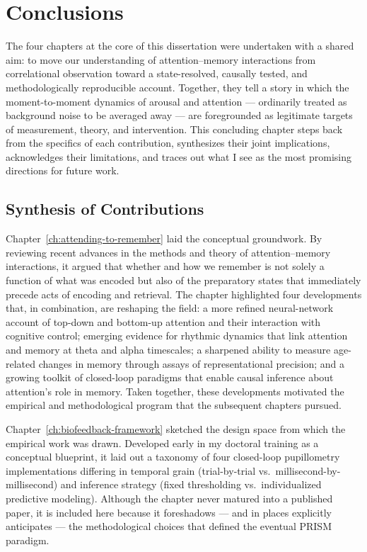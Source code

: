 \chapter{Conclusions}\label{ch:conclusions}

The four chapters at the core of this dissertation were undertaken with a shared aim: to move our understanding of attention--memory interactions from correlational observation toward a state-resolved, causally tested, and methodologically reproducible account. Together, they tell a story in which the moment-to-moment dynamics of arousal and attention --- ordinarily treated as background noise to be averaged away --- are foregrounded as legitimate targets of measurement, theory, and intervention. This concluding chapter steps back from the specifics of each contribution, synthesizes their joint implications, acknowledges their limitations, and traces out what I see as the most promising directions for future work.

\section{Synthesis of Contributions}

Chapter~\ref{ch:attending-to-remember} laid the conceptual groundwork. By reviewing recent advances in the methods and theory of attention--memory interactions, it argued that whether and how we remember is not solely a function of what was encoded but also of the preparatory states that immediately precede acts of encoding and retrieval. The chapter highlighted four developments that, in combination, are reshaping the field: a more refined neural-network account of top-down and bottom-up attention and their interaction with cognitive control; emerging evidence for rhythmic dynamics that link attention and memory at theta and alpha timescales; a sharpened ability to measure age-related changes in memory through assays of representational precision; and a growing toolkit of closed-loop paradigms that enable causal inference about attention's role in memory. Taken together, these developments motivated the empirical and methodological program that the subsequent chapters pursued.

Chapter~\ref{ch:biofeedback-framework} sketched the design space from which the empirical work was drawn. Developed early in my doctoral training as a conceptual blueprint, it laid out a taxonomy of four closed-loop pupillometry implementations differing in temporal grain (trial-by-trial vs.\ millisecond-by-millisecond) and inference strategy (fixed thresholding vs.\ individualized predictive modeling). Although the chapter never matured into a published paper, it is included here because it foreshadows --- and in places explicitly anticipates --- the methodological choices that defined the eventual PRISM paradigm.


